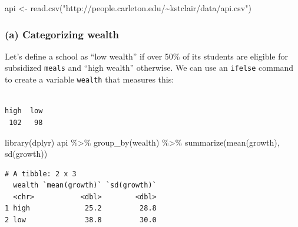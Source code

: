 \documentclass[
]{book}
\newenvironment{Shaded}{\begin{snugshade}}{\end{snugshade}}
\newcommand{\DecValTok}[1]{\textcolor[rgb]{0.00,0.00,0.81}{#1}}
\newcommand{\FunctionTok}[1]{\textcolor[rgb]{0.00,0.00,0.00}{#1}}
\newcommand{\NormalTok}[1]{#1}
\newcommand{\OtherTok}[1]{\textcolor[rgb]{0.56,0.35,0.01}{#1}}
\newcommand{\SpecialCharTok}[1]{\textcolor[rgb]{0.00,0.00,0.00}{#1}}
\newcommand{\StringTok}[1]{\textcolor[rgb]{0.31,0.60,0.02}{#1}}
\begin{document}
\begin{Shaded}
\begin{Highlighting}[]
\NormalTok{api }\OtherTok{\textless{}{-}} \FunctionTok{read.csv}\NormalTok{(}\StringTok{"http://people.carleton.edu/\textasciitilde{}kstclair/data/api.csv"}\NormalTok{)}
\end{Highlighting}
\end{Shaded}

\hypertarget{a-categorizing-wealth-1}{%
\subsubsection{(a) Categorizing wealth}\label{a-categorizing-wealth-1}}

Let's define a school as ``low wealth'' if over 50\% of its students are eligible for subsidized \texttt{meals} and ``high wealth'' otherwise. We can use an \texttt{ifelse} command to create a variable \texttt{wealth} that measures this:

\begin{Shaded}
\end{Shaded}

\begin{verbatim}

high  low 
 102   98 
\end{verbatim}

\begin{Shaded}
\begin{Highlighting}[]
\FunctionTok{library}\NormalTok{(dplyr)}
\NormalTok{api }\SpecialCharTok{\%\textgreater{}\%} \FunctionTok{group\_by}\NormalTok{(wealth) }\SpecialCharTok{\%\textgreater{}\%} \FunctionTok{summarize}\NormalTok{(}\FunctionTok{mean}\NormalTok{(growth), }\FunctionTok{sd}\NormalTok{(growth))}
\end{Highlighting}
\end{Shaded}

\begin{verbatim}
# A tibble: 2 x 3
  wealth `mean(growth)` `sd(growth)`
  <chr>           <dbl>        <dbl>
1 high             25.2         28.8
2 low              38.8         30.0
\end{verbatim}
\end{document}
